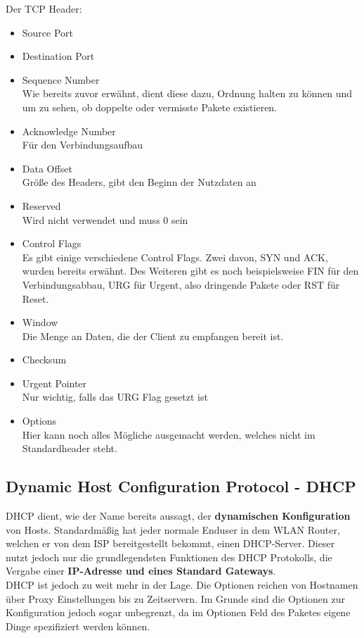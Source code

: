 \documentclass[12pt,a4paper]{report}
\begin{document}
\begin{onehalfspace}
Der TCP Header:\\
\begin{itemize}
\item Source Port
\item Destination Port
\item Sequence Number\\
Wie bereits zuvor erwähnt, dient diese dazu, Ordnung halten zu können und um zu sehen, ob doppelte oder vermisste Pakete existieren.
\item Acknowledge Number\\
Für den Verbindungsaufbau
\item Data Offset\\
Größe des Headers, gibt den Beginn der Nutzdaten an
\item Reserved\\
Wird nicht verwendet und muss 0 sein
\item Control Flags\\
Es gibt einige verschiedene Control Flags. Zwei davon, SYN und ACK, wurden bereits erwähnt. Des Weiteren gibt es noch beispielsweise FIN für den Verbindungsabbau, URG für Urgent, also dringende Pakete oder RST für Reset.
\item Window \\
Die Menge an Daten, die der Client zu empfangen bereit ist.
\item Checksum
\item Urgent Pointer\\
Nur wichtig, falls das URG Flag gesetzt ist
\item Options\\
Hier kann noch alles Mögliche ausgemacht werden, welches nicht im Standardheader steht.
\end{itemize}
\subsection{Dynamic Host Configuration Protocol - DHCP}\label{ssec:dhcp}
DHCP dient, wie der Name bereits aussagt, der \textbf{dynamischen Konfiguration} von Hosts. Standardmäßig hat jeder normale Enduser in dem WLAN Router, welchen er von dem ISP bereitgestellt bekommt, einen DHCP-Server. Dieser nutzt jedoch nur die grundlegendsten Funktionen des DHCP Protokolls, die Vergabe einer \textbf{IP-Adresse und eines Standard Gateways}.\\
DHCP ist jedoch zu weit mehr in der Lage. Die Optionen reichen von Hostnamen über Proxy Einstellungen bis zu Zeitservern. Im Grunde sind die Optionen zur Konfiguration jedoch sogar unbegrenzt, da im Optionen Feld des Paketes eigene Dinge spezifiziert werden können.\\


\end{onehalfspace}
\end{document}
